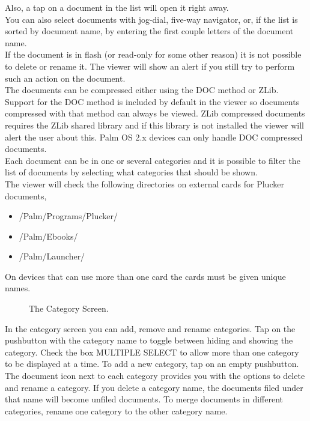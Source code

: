 Also, a tap on a document in the list will open it right away.\\

You can also select documents with jog-dial, five-way navigator,
or, if the list is sorted by document name, by entering the first couple
letters of the document name.\\

If the document is in flash (or read-only for some other reason)
it is not possible to delete or rename it. The viewer will show
an alert if you still try to perform such an action on the document.\\

The documents can be compressed either using the DOC method or
ZLib. Support for the DOC method is included by default in the
viewer so documents compressed with that method can always be
viewed. ZLib compressed documents requires the ZLib shared
library and if this library is not installed the viewer will
alert the user about this. Palm OS 2.x devices can only handle
DOC compressed documents.\\

Each document can be in one or several categories and it is possible
to filter the list of documents by selecting what categories that
should be shown.\\

The viewer will check the following directories on external cards
for Plucker documents,\\

\begin{itemize}
  \item /Palm/Programs/Plucker/
  \item /Palm/Ebooks/
  \item /Palm/Launcher/
\end{itemize}

On devices that can use more than one card the cards must be given
unique names.\\

\begin{figure} [!htb]
\centerline{}
\caption{\label{fig:Category}The Category Screen.}
\end{figure}

In the category screen you can add, remove and rename categories.
Tap on the pushbutton with the category name to toggle between hiding
and showing the category. Check the box MULTIPLE SELECT to allow more
than one category to be displayed at a time. To add a new category,
tap on an empty pushbutton. The document icon next to each category
provides you with the options to delete and rename a category. If you 
delete a category name, the documents filed under that name will become 
unfiled documents. To merge documents in different categories, rename 
one category to the other category name.

